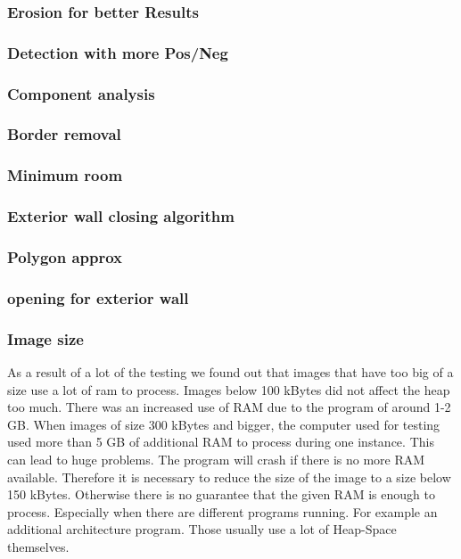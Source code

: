 \subsubsection{Erosion for better Results}
\subsubsection{Detection with more Pos/Neg}
\subsubsection{Component analysis}
\subsubsection{Border removal}
\subsubsection{Minimum room}
\subsubsection{Exterior wall closing algorithm}
\subsubsection{Polygon approx}
\subsubsection{opening for exterior wall}
\subsubsection{Image size}
As a result of a lot of the testing we found out that images that have too big of a size use a lot of ram to process. Images below 100 kBytes did not affect the heap too much. There was an increased use of RAM due to the program of around 1-2 GB. When images of size 300 kBytes and bigger, the computer used for testing used more than 5 GB of additional RAM to process during one instance. This can lead to huge problems. The program will crash if there is no more RAM available. Therefore it is necessary to reduce the size of the image to a size below 150 kBytes. Otherwise there is no guarantee that the given RAM is enough to process. Especially when there are different programs running. For example an additional architecture program. Those usually use a lot of Heap-Space themselves. 

